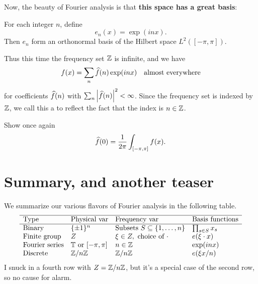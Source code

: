Now, the beauty of Fourier analysis is that
\textbf{this space has a great basis}:
\begin{theorem}
	For each integer $n$, define
	\[ e_n(x) = \exp(inx). \]
	Then $e_n$ form an orthonormal basis
	of the Hilbert space $L^2([-\pi, \pi])$.
\end{theorem}
Thus this time the frequency set $\mathbb Z$ is infinite, and we have
\[ f(x) = \sum_n \widehat f(n) \exp(inx)
	\quad\text{almost everywhere} \]
for coefficients $\widehat f(n)$
with $\sum_n \left\lvert \widehat f(n) \right\rvert^2 < \infty$.
Since the frequency set is indexed by $\mathbb Z$,
we call this a 
to reflect the fact that the index is $n \in \mathbb Z$.
\begin{exercise}
	Show once again
	\[ \widehat f(0) = \frac{1}{2\pi} \int_{[-\pi, \pi]} f(x). \]
\end{exercise}

\section{Summary, and another teaser}
We summarize our various flavors of Fourier analysis in the following table.
\[
	\begin{array}{llll}
		\hline
		\text{Type} & \text{Physical var} & \text{Frequency var}
			& \text{Basis functions} \\ \hline
		\text{Binary} & \{\pm1\}^n
			& \text{Subsets } S \subseteq \left\{ 1, \dots, n \right\}
			& \prod_{s \in S} x_s \\
		\text{Finite group} & Z & \xi \in Z, \text{ choice of } \cdot
			& e(\xi \cdot x) \\
		\text{Fourier series} & \mathbb T \text{ or } [-\pi, \pi] & n \in \mathbb Z
			& \exp(inx) \\
		\text{Discrete} & \mathbb Z/n\mathbb Z
			& \mathbb Z/n\mathbb Z
			& e(\xi x / n) \\
	\end{array}
\]
I snuck in a fourth row with $Z  = \mathbb Z/n\mathbb Z$,
but it's a special case of the second row, so no cause for alarm.

